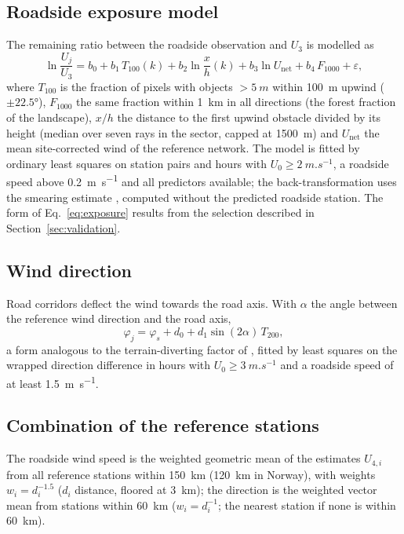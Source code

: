 \subsection{Roadside exposure model}
The remaining ratio between the roadside observation and $U_3$ is modelled as
\begin{equation}
\ln\frac{U_j}{U_3} = b_0 + b_1\,T_{100}(k) + b_2 \ln\frac{x}{h}(k) + b_3 \ln U_{\mathrm{net}} + b_4\,F_{1000} + \varepsilon ,
\label{eq:exposure}
\end{equation}
where $T_{100}$ is the fraction of pixels with objects $>\SI{5}{m}$ within \SI{100}{m} upwind ($\pm\ang{22.5}$), $F_{1000}$ the same fraction within \SI{1}{km} in all directions (the forest fraction of the landscape), $x/h$ the distance to the first upwind obstacle divided by its height (median over seven rays in the sector, capped at \SI{1500}{m}) and $U_{\mathrm{net}}$ the mean site-corrected wind of the reference network. The model is fitted by ordinary least squares on station pairs and hours with $U_0\ge\SI{2}{m.s^{-1}}$, a roadside speed above \SI{0.2}{m.s^{-1}} and all predictors available; the back-transformation uses the smearing estimate \citep{Duan1983}, computed without the predicted roadside station. The form of Eq.~\eqref{eq:exposure} results from the selection described in Section~\ref{sec:validation}.

\subsection{Wind direction}
Road corridors deflect the wind towards the road axis. With $\alpha$ the angle between the reference wind direction and the road axis,
\begin{equation}
\varphi_j = \varphi_s + d_0 + d_1 \sin(2\alpha)\,T_{200},
\end{equation}
a form analogous to the terrain-diverting factor of \citet{ListonElder2006}, fitted by least squares on the wrapped direction difference in hours with $U_0\ge\SI{3}{m.s^{-1}}$ and a roadside speed of at least \SI{1.5}{m.s^{-1}}.

\subsection{Combination of the reference stations}
\label{sec:combine}
The roadside wind speed is the weighted geometric mean of the estimates $U_{4,i}$ from all reference stations within \SI{150}{km} (\SI{120}{km} in Norway), with weights $w_i = d_i^{-1.5}$ ($d_i$ distance, floored at \SI{3}{km}); the direction is the weighted vector mean from stations within \SI{60}{km} ($w_i=d_i^{-1}$; the nearest station if none is within \SI{60}{km}).

